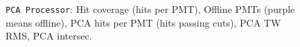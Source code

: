 \documentclass[12pt]{article}
\begin{document}
\begin{figure}
\centering
\noindent{}
  \caption{\centering \texttt{PCA Processor}: Hit coverage (hits per PMT), Offline PMTs (purple means offline), PCA hits per PMT (hits passing cuts), PCA TW RMS, PCA intersec.\hspace{\textwidth}}
  \label{fig:pca1}
\end{figure}
\end{document}
